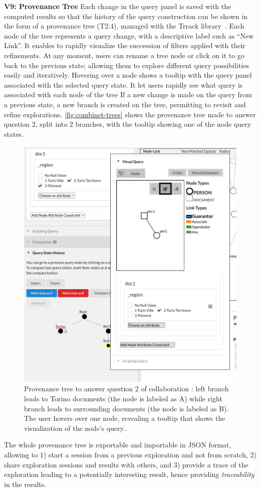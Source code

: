 \noindent\textbf{V9: Provenance Tree}
Each change in the query panel is saved with the computed results so that the history of the query construction can be shown in the form of a provenance tree (T2.4), managed with the Trrack library~\cite{cutlerTrrackLibraryProvenanceTracking2020}.
Each node of the tree represents a query change, with a descriptive label such as ``New Link''.
It enables to rapidly visualize the succession of filters applied with their refinements.
At any moment, users can rename a tree node or click on it to go back to the previous state; allowing them to explore different query possibilities easily and iteratively.
Hovering over a node shows a tooltip with the query panel associated with the selected query state.
It let users rapidly see what query is associated with each node of the tree
If a new change is made on the query from a previous state, a new branch is created on the tree, permitting to revisit and refine explorations.  \autoref{fig:combinet-trees} shows the provenance tree made to answer question 2, split into 2 branches, with the tooltip showing one of the node query states.
\begin{figure}[!ht]
     \centering
     \includegraphics[width=0.5\linewidth]{static/figures/ComBiNet/tree_tooltip_torinoquery_crop}
     \caption{Provenance tree to answer question 2 of collaboration \pascal: left branch leads to Torino documents (the node is labeled as A) while right branch leads to surrounding documents (the node is labeled as B). The user hovers over one node, revealing a tooltip that shows the visualization of the node's query..}\label{fig:combinet-trees}
 \end{figure}
The whole provenance tree is exportable and importable in JSON format, allowing to 1) start a session from a previous exploration and not from scratch, 2) share exploration sessions and results with others, and 3) provide a trace of the exploration leading to a potentially interesting result, hence providing \emph{traceability} in the results.


